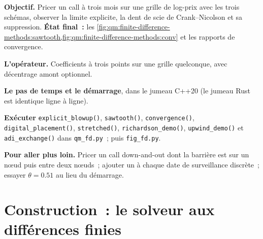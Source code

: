 \begin{tutorial}
\textbf{Objectif.} Pricer un call à trois mois sur une grille de log-prix avec les trois schémas, observer la limite explicite, la dent de scie de Crank--Nicolson et sa suppression. \textbf{État final~:}
les \cref{fig:qm:finite-difference-methods:sawtooth,fig:qm:finite-difference-methods:conv} et les rapports de convergence.
\begin{tutsteps}
\item \textbf{L'opérateur.} Coefficients à trois points sur une grille quelconque, avec décentrage amont optionnel.
\item \textbf{Le pas de temps et le démarrage}, dans le jumeau C++20 (le jumeau Rust est identique ligne à ligne).
\item \textbf{Exécuter} \texttt{explicit\_blowup()}, \texttt{sawtooth()}, \texttt{convergence()}, \texttt{digital\_placement()}, \texttt{stretched()}, \texttt{richardson\_demo()},
\texttt{upwind\_demo()} et \texttt{adi\_exchange()} dans \texttt{qm\_fd.py}~; puis \texttt{fig\_fd.py}.
\end{tutsteps}
\textbf{Pour aller plus loin.} Pricer un call down-and-out dont la barrière est sur un nœud puis entre deux nœuds~; ajouter un  à chaque date de surveillance discrète~; essayer $\theta = 0.51$ au lieu du démarrage.
\end{tutorial}

\section{Construction~: le solveur aux différences finies}\label{bld:qm:finite-difference-methods:pde}

